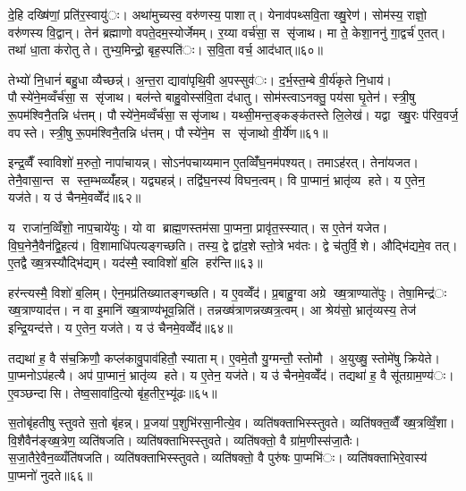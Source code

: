 दे॒हि दख्षि॑णां॒ प्रति॑र॒स्वायु॑ः। अथा॑मुच्यस्व॒ वरु॑णस्य॒ पाशात्। येनाव॑पथ्सवि॒ता ख्षु॒रेण॑। सोम॑स्य॒ राज्ञो॒ वरु॑णस्य वि॒द्वान्। तेन॑ ब्रह्माणो वपते॒दम॒स्योर्जेमम्। र॒य्या वर्च॑सा॒ स सृ॑जाथ। मा ते॒ केशा॒ननु॑ गा॒द्वर्च॑ ए॒तत्। तथा॑ धा॒ता क॑रोतु ते। तुभ्य॒मिन्द्रो॒ बृह॒स्पति॑ः। स॒वि॒ता वर्च॒ आद॑धात्॥६०॥

तेभ्यो॑ नि॒धानं॑ बहु॒धा व्यैच्छन्न्॑। अ॒न्त॒रा द्यावा॑पृथि॒वी अ॒पस्सुव॑ः। द॒र्भ॒स्त॒म्बे वी॒र्य॑कृते नि॒धाय॑। पौस्ये॑ने॒मव्वँर्च॑सा॒ स सृ॑जाथ। बल॑न्ते बाहु॒वोस्स॑वि॒ता द॑धातु। सोम॑स्त्वाऽनक्तु॒ पय॑सा घृ॒तेन॑। स्त्री॒षु रू॒पम॑श्विनै॒तन्नि ध॑त्तम्। पौस्ये॑ने॒मव्वँर्च॑सा॒ ससृ॑जाथ। यथ्सी॒मन्त॒ङ्कङ्क॑तस्ते लि॒लेख॑। यद्वा ख्षु॒रः प॑रिव॒वर्ज॒ वपस्ते। स्त्री॒षु रू॒पम॑श्विनै॒तन्नि ध॑त्तम्। पौस्ये॑ने॒म स सृ॑जाथो वी॒र्ये॑ण॥६१॥


इन्द्र॒व्वैँ स्वाविशो॑ म॒रुतो॒ नापा॑चायन्न्। सोऽन॑पचाय्यमान ए॒तव्विँ॑घ॒नम॑पश्यत्। तमाऽह॑रत्। तेना॑यजत। तेनै॒वासा॒न्त स स्त॒म्भव्व्यँ॑हन्न्। यद्व्यहन्न्॑। तद्वि॑घ॒नस्य॑ विघन॒त्वम्। वि पा॒प्मानं॒ भ्रातृ॑व्य हते। य ए॒तेन॒ यज॑ते। य उ॑ चैनमे॒वव्वेँद॑॥६२॥

य राजा॑न॒व्विँशो॒ नाप॒चाये॑युः। यो वा ब्राह्म॒णस्तम॑सा पा॒प्मना॒ प्रावृ॑त॒स्स्यात्। स ए॒तेन॑ यजेत। वि॒घ॒नेनै॒वैन॑द्वि॒हत्य॑। वि॒शामाधि॑पत्यङ्गच्छति। तस्य॒ द्वे द्वा॑द॒शे स्तो॒त्रे भव॑तः। द्वे च॑तुर्वि॒शे। औद्भि॑द्यमे॒व तत्। ए॒तद्वै ख्ष॒त्रस्यौद्भि॑द्यम्। यद॑स्मै॒ स्वाविशो॑ ब॒लि हर॑न्ति॥६३॥

हर॑न्त्यस्मै॒ विशो॑ ब॒लिम्। ऐन॒मप्र॑तिख्यातङ्गच्छति। य ए॒वव्वेँद॑। प्र॒बाहु॒ग्वा अग्रे ख्ष॒त्राण्याते॑पुः। तेषा॒मिन्द्र॑ः ख्ष॒त्राण्याद॑त्त। न वा इ॒मानि॑ ख्ष॒त्राण्य॑भूव॒न्निति॑। तन्नख्ष॑त्राणन्नख्षत्र॒त्वम्। आ श्रेय॑सो॒ भ्रातृ॑व्यस्य॒ तेज॑ इन्द्रि॒यन्द॑त्ते। य ए॒तेन॒ यज॑ते। य उ॑ चैनमे॒वव्वेँद॑॥६४॥

तद्यथा॑ ह॒ वै स॑च॒क्रिणौ॒ कप्ल॑कावु॒पाव॑हितौ॒ स्याताम्। ए॒वमे॒तौ यु॒ग्मन्तौ॒ स्तोमौ। अ॒युख्षु॒ स्तोमे॑षु क्रियेते। पा॒प्मनोऽप॑हत्यै। अप॑ पा॒प्मानं॒ भ्रातृ॑व्य हते। य ए॒तेन॒ यज॑ते। य उ॑ चैनमे॒वव्वेँद॑। तद्यथा॑ ह॒ वै सू॑तग्राम॒ण्य॑ः। ए॒वञ्छन्दासि। तेष्व॒सावा॑दि॒त्यो बृ॑ह॒तीर॒भ्यू॑ढः॥६५॥

स॒तोबृ॑हतीषु स्तुवते स॒तो बृ॑हन्न्। प्र॒जया॑ प॒शुभि॑रसा॒नीत्ये॒व। व्यति॑षक्ताभिस्स्तुवते। व्यति॑षक्त॒व्वैँ ख्ष॒त्रव्विँ॒शा। वि॒शैवैन॑ङ्ख्ष॒त्रेण॒ व्यति॑षजति। व्यति॑षक्ताभिस्स्तुवते। व्यति॑षक्तो॒ वै ग्रा॑म॒णीस्स॑जा॒तैः। स॒जा॒तैरे॒वैन॒व्व्यँति॑षजति। व्यति॑षक्ताभिस्स्तुवते। व्यति॑षक्तो॒ वै पुरु॑षः पा॒प्मभि॑ः। व्यति॑षक्ताभिरे॒वास्य॑ पा॒प्मनो॑ नुदते॥६६॥


